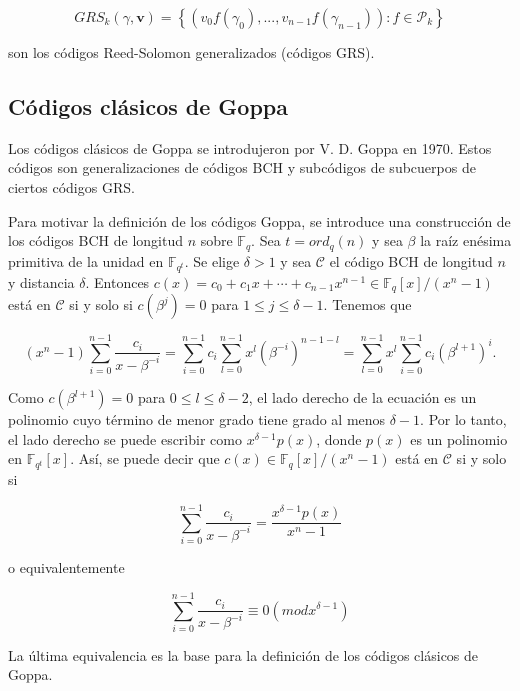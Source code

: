 $$GRS_k (\gamma, \textbf{v}) = \left\{ \left( v_0 f(\gamma_0), ..., v_{n-1}f(\gamma_{n-1}) \right) : f \in \mathcal{P}_k \right\}$$

son los códigos Reed-Solomon generalizados (códigos GRS).

\subsection{Códigos clásicos de Goppa}

Los códigos clásicos de Goppa se introdujeron por V. D. Goppa en 1970. Estos códigos son generalizaciones de códigos BCH y subcódigos de subcuerpos de ciertos códigos GRS.

Para motivar la definición de los códigos Goppa, se introduce una construcción de los códigos BCH de longitud $n$ sobre $\mathbb{F}_q$. Sea $t = ord_q(n)$ y sea $\beta$ la raíz enésima primitiva de la unidad en $\mathbb{F}_{q^t}$. Se elige $\delta > 1$ y sea $\mathcal{C}$ el código BCH de longitud $n$ y distancia $\delta$. Entonces $c(x) = c_0 + c_1x + \cdots + c_{n-1}x^{n-1} \in \mathbb{F}_q [x] / (x^n - 1)$ está en $\mathcal{C}$ si y solo si $c(\beta^j) = 0$ para $1 \leq j \leq \delta - 1$. Tenemos que 

$$(x^n - 1) \sum_{i=0}^{n-1} \frac{c_i}{x - \beta ^{-i}} = \sum_{i=0}^{n-1} c_i \sum_{l=0}^{n-1} x^l (\beta ^{-i})^{n-1-l} = \sum_{l=0}^{n-1} x^l \sum_{i=0}^{n-1} c_i (\beta^{l+1})^i.$$

Como $c(\beta^{l+1}) = 0$ para $0 \leq l \leq \delta - 2$, el lado derecho de la ecuación es un polinomio cuyo término de menor grado tiene grado al menos $\delta - 1$. Por lo tanto, el lado derecho se puede escribir como $x^{\delta - 1} p(x)$, donde $p(x)$ es un polinomio en $\mathbb{F}_{q^t}[x]$. Así, se puede decir que $c(x) \in \mathbb{F}_q[x] / (x^n - 1)$ está en $\mathcal{C}$ si y solo si 

$$\sum_{i=0}^{n-1} \frac{c_i}{x - \beta ^{-i}} = \frac{x^{\delta - 1} p(x)}{x^n - 1}$$

o equivalentemente

$$\sum_{i=0}^{n-1} \frac{c_i}{x - \beta ^{-i}} \equiv 0 (mod x^{\delta - 1})$$

La última equivalencia es la base para la definición de los códigos clásicos de Goppa.

